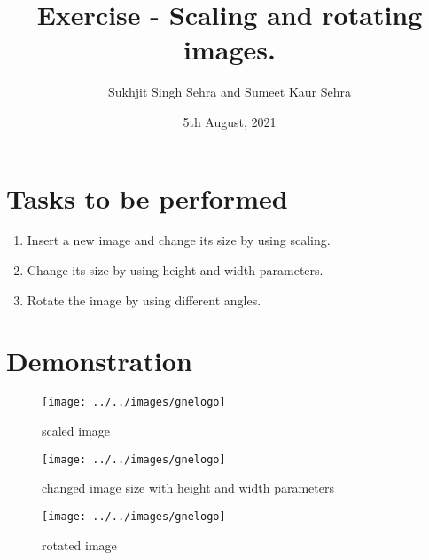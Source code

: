 \documentclass{article}
\title{Exercise  - Scaling and rotating images.}
\author{Sukhjit Singh Sehra and Sumeet Kaur Sehra}
\date{5th August, 2021}
\begin{document}
	\maketitle	
	\section*{Tasks to be performed}
	\begin{enumerate}	
		\item Insert a new image and change its size by using scaling.
		\item Change its size by using height and width parameters.
		\item Rotate the image by using different angles.
		
		\end{enumerate}
	\section*{Demonstration}
	

		\begin{figure}
		\centering
		\texttt{[image: ../../images/gnelogo]}
		\caption{scaled image}
		\label{fig:logo}
		\end{figure}
		\begin{figure}
			\centering
			\texttt{[image: ../../images/gnelogo]}
			\caption{changed image size with height and width parameters}
			\label{fig:logo}
		\end{figure}
		\begin{figure}
			\centering
			\texttt{[image: ../../images/gnelogo]}
			\caption{rotated image}
			\label{fig:logo}
			
		\end{figure}

	
\end{document}
